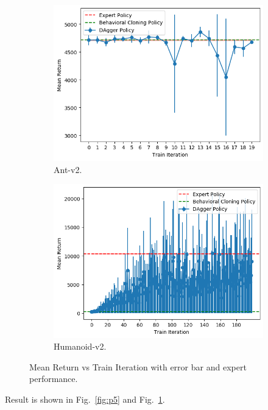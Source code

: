 \documentclass{article}
\newcommand{\fref}[1]{Fig.~\ref{#1}}
\begin{document}
\begin{figure}[h!]
  \centering
  \begin{subfigure}[b]{.49\linewidth}
    \centering
    \includegraphics[width=\columnwidth]{figs/ant_DAgger.png}
    \caption{Ant-v2.}
  \end{subfigure}
  \begin{subfigure}[b]{.49\linewidth}
    \centering
    \includegraphics[width=\columnwidth]{figs/humanoid_DAgger.png}
    \caption{Humanoid-v2.}
  \end{subfigure}
  \caption{Mean Return vs Train Iteration with error bar and expert performance.}
  \label{fig:p6}
\end{figure}

Result is shown in \fref{fig:p5} and \fref{fig:p6}.
\end{document}
